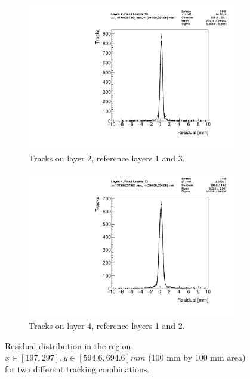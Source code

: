 \begin{figure}
\centering
\begin{subfigure}{.5\textwidth}
  \centering
  \includegraphics[width=\linewidth]{figures/figure_res_dist_QL2P11_3100V_2021-08-05_xbin_12_ybin_7_layer2_fixedlayers13.pdf}
  \caption{Tracks on layer 2, reference layers 1 and 3.}
  \label{fig:res_dist_L2_F13}
\end{subfigure}%
\begin{subfigure}{.5\textwidth}
  \centering
  \includegraphics[width=\linewidth]{figures/figure_res_dist_QL2P11_3100V_2021-08-05_xbin_12_ybin_7_layer4_fixedlayers13.pdf}
  \caption{Tracks on layer 4, reference layers 1 and 2.}
  \label{fig:res_dist_L4_F12}
\end{subfigure}
\caption{Residual distribution in the region $x\in\left[197, 297\right],  y\in\left[594.6, 694.6\right] mm$ (100 mm by 100 mm area) for two different tracking combinations. }
\label{fig:res_dist}
\end{figure}

